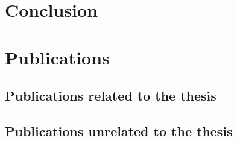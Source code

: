 \documentclass[11pt]{article}
\begin{document}
\section{Conclusion}
\label{sec:conclusion}

\section{Publications}
\label{sec:publications}\nocite{*}

\subsection*{Publications related to the thesis}
\printbibliography[keyword=related,heading=none]

\subsection*{Publications unrelated to the thesis}
\printbibliography[keyword=unrelated,heading=none]

\printbibliography[keyword=foreign]
\end{document}
